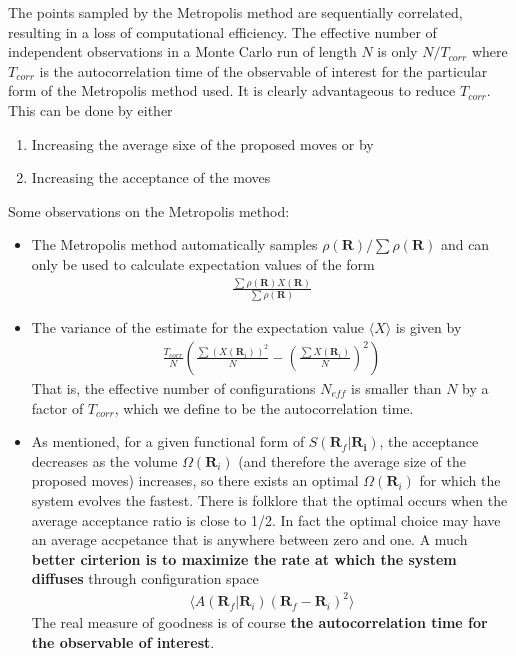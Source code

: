\documentclass[twoside,english]{uiofysmaster}
\begin{document}
The points sampled by the Metropolis method are sequentially correlated, resulting in a loss of computational efficiency. The effective number of independent observations in a Monte Carlo run of length $N$ is only $N/T_{corr}$ where $T_{corr}$ is the autocorrelation time of the observable of interest for the particular form of the Metropolis method used. It is clearly advantageous to reduce $T_{corr}$. This can be done by either
\begin{enumerate}
	\item Increasing the average sixe of the proposed moves or by
	\item Increasing the acceptance of the moves
\end{enumerate}

Some observations on the Metropolis method:
\begin{itemize}
	\item The Metropolis method automatically samples $\rho(\bm{R})/\sum \rho(\bm{R})$ and can only be used to calculate expectation values of the form
	\begin{align}
		\frac{\sum \rho(\bm{R}) X(\bm{R})} {\sum \rho(\bm{R})}
	\end{align}
	\item The variance of the estimate for the expectation value $\langle X \rangle$ is given by
	\begin{align}
		\frac{T_{corr}}{N} (\frac{\sum (X(\bm{R}_i))^2}{N} - (\frac{\sum X(\bm{R}_i)}{N})^2  )
	\end{align}
	That is, the effective number of configurations $N_{eff}$ is smaller than $N$ by a factor of $T_{corr}$, which we define to be the autocorrelation time.
	\item As mentioned, for a given functional form of $S(\bm{R}_f | \bm{R_i})$, the acceptance decreases as the volume $\Omega(\bm{R}_i)$ (and therefore the average size of the proposed moves) increases, so there exists an optimal $\Omega(\bm{R}_i)$ for which the system evolves the fastest. There is folklore that the optimal occurs when the average acceptance ratio is close to 1/2. In fact the optimal choice may have an average accpetance that is anywhere between zero and one. A much \textbf{better cirterion is to maximize the rate at which the system diffuses} through configuration space
	\begin{align}
		\langle A(\bm{R}_f | \bm{R}_i) (\bm{R}_f - \bm{R}_i)^2 \rangle
	\end{align}
	The real measure of goodness is of course \textbf{the autocorrelation time for the observable of interest}.
\end{itemize}
\end{document}
